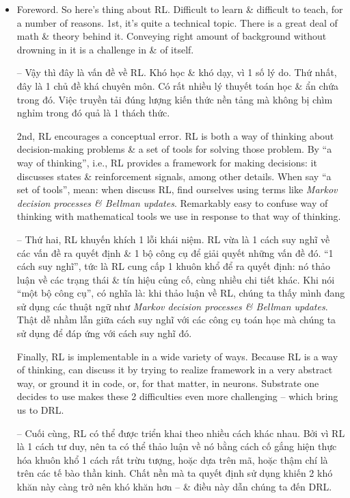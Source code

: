 \documentclass{article}
\begin{document}
\begin{itemize}
    \item {\sf Foreword.} So here's thing about RL. Difficult to learn \& difficult to teach, for a number of reasons. 1st, it's quite a technical topic. There is a great deal of math \& theory behind it. Conveying right amount of background without drowning in it is a challenge in \& of itself.

    -- Vậy thì đây là vấn đề về RL. Khó học \& khó dạy, vì 1 số lý do. Thứ nhất, đây là 1 chủ đề khá chuyên môn. Có rất nhiều lý thuyết toán học \& ẩn chứa trong đó. Việc truyền tải đúng lượng kiến thức nền tảng mà không bị chìm nghỉm trong đó quả là 1 thách thức.

    2nd, RL encourages a conceptual error. RL is both a way of thinking about decision-making problems \& a set of tools for solving those problem. By ``a way of thinking'', i.e., RL provides a framework for making decisions: it discusses states \& reinforcement signals, among other details. When say ``a set of tools'', mean: when discuss RL, find ourselves using terms like {\it Markov decision processes \& Bellman updates}. Remarkably easy to confuse way of thinking with mathematical tools we use in response to that way of thinking.

    -- Thứ hai, RL khuyến khích 1 lỗi khái niệm. RL vừa là 1 cách suy nghĩ về các vấn đề ra quyết định \& 1 bộ công cụ để giải quyết những vấn đề đó. ``1 cách suy nghĩ'', tức là RL cung cấp 1 khuôn khổ để ra quyết định: nó thảo luận về các trạng thái \& tín hiệu củng cố, cùng nhiều chi tiết khác. Khi nói ``một bộ công cụ'', có nghĩa là: khi thảo luận về RL, chúng ta thấy mình đang sử dụng các thuật ngữ như {\it Markov decision processes \& Bellman updates}. Thật dễ nhầm lẫn giữa cách suy nghĩ với các công cụ toán học mà chúng ta sử dụng để đáp ứng với cách suy nghĩ đó.

    Finally, RL is implementable in a wide variety of ways. Because RL is a way of thinking, can discuss it by trying to realize framework in a very abstract way, or ground it in code, or, for that matter, in neurons. Substrate one decides to use makes these 2 difficulties even more challenging -- which bring us to DRL.

    -- Cuối cùng, RL có thể được triển khai theo nhiều cách khác nhau. Bởi vì RL là 1 cách tư duy, nên ta có thể thảo luận về nó bằng cách cố gắng hiện thực hóa khuôn khổ 1 cách rất trừu tượng, hoặc dựa trên mã, hoặc thậm chí là trên các tế bào thần kinh. Chất nền mà ta quyết định sử dụng khiến 2 khó khăn này càng trở nên khó khăn hơn -- \& điều này dẫn chúng ta đến DRL.


\end{itemize}
\end{document}
